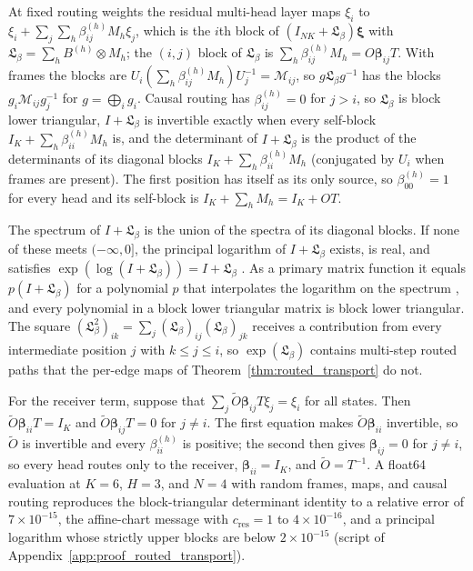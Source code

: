 \documentclass[twoside,11pt]{article}
\begin{document}
At fixed routing weights the residual multi-head layer maps $\xi_i$ to $\xi_i+\sum_j\sum_h\beta_{ij}^{(h)}M_h\xi_j$, which is the $i$th block of $(I_{NK}+\mathfrak L_\beta)\boldsymbol\xi$ with $\mathfrak L_\beta=\sum_hB^{(h)}\otimes M_h$; the $(i,j)$ block of $\mathfrak L_\beta$ is $\sum_h\beta_{ij}^{(h)}M_h=O\boldsymbol\beta_{ij}T$. With frames the blocks are $U_i(\sum_h\beta_{ij}^{(h)}M_h)U_j^{-1}=\mathcal M_{ij}$, so $g\mathfrak L_\beta g^{-1}$ has the blocks $g_i\mathcal M_{ij}g_j^{-1}$ for $g=\bigoplus_ig_i$. Causal routing has $\beta_{ij}^{(h)}=0$ for $j>i$, so $\mathfrak L_\beta$ is block lower triangular, $I+\mathfrak L_\beta$ is invertible exactly when every self-block $I_K+\sum_h\beta_{ii}^{(h)}M_h$ is, and the determinant of $I+\mathfrak L_\beta$ is the product of the determinants of its diagonal blocks $I_K+\sum_h\beta_{ii}^{(h)}M_h$ (conjugated by $U_i$ when frames are present). The first position has itself as its only source, so $\beta_{00}^{(h)}=1$ for every head and its self-block is $I_K+\sum_hM_h=I_K+OT$.

The spectrum of $I+\mathfrak L_\beta$ is the union of the spectra of its diagonal blocks. If none of these meets $(-\infty,0]$, the principal logarithm of $I+\mathfrak L_\beta$ exists, is real, and satisfies $\exp(\log(I+\mathfrak L_\beta))=I+\mathfrak L_\beta$ \citep[Thm.~1.31]{Higham2008}. As a primary matrix function it equals $p(I+\mathfrak L_\beta)$ for a polynomial $p$ that interpolates the logarithm on the spectrum \citep[Ch.~1]{Higham2008}, and every polynomial in a block lower triangular matrix is block lower triangular. The square $(\mathfrak L_\beta^2)_{ik}=\sum_j(\mathfrak L_\beta)_{ij}(\mathfrak L_\beta)_{jk}$ receives a contribution from every intermediate position $j$ with $k\le j\le i$, so $\exp(\mathfrak L_\beta)$ contains multi-step routed paths that the per-edge maps of Theorem~\ref{thm:routed_transport} do not.

For the receiver term, suppose that $\sum_j\widetilde O\boldsymbol\beta_{ij}T\xi_j=\xi_i$ for all states. Then $\widetilde O\boldsymbol\beta_{ii}T=I_K$ and $\widetilde O\boldsymbol\beta_{ij}T=0$ for $j\ne i$. The first equation makes $\widetilde O\boldsymbol\beta_{ii}$ invertible, so $\widetilde O$ is invertible and every $\beta_{ii}^{(h)}$ is positive; the second then gives $\boldsymbol\beta_{ij}=0$ for $j\ne i$, so every head routes only to the receiver, $\boldsymbol\beta_{ii}=I_K$, and $\widetilde O=T^{-1}$. A float64 evaluation at $K=6$, $H=3$, and $N=4$ with random frames, maps, and causal routing reproduces the block-triangular determinant identity to a relative error of $7\times10^{-15}$, the affine-chart message with $c_{\mathrm{res}}=1$ to $4\times10^{-16}$, and a principal logarithm whose strictly upper blocks are below $2\times10^{-15}$ (script of Appendix~\ref{app:proof_routed_transport}).
\end{document}
